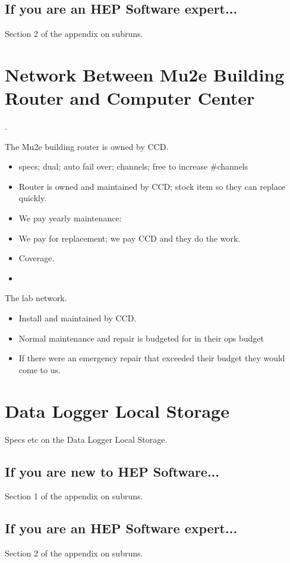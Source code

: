 \section{If you are an HEP Software expert...}

Section 2 of the appendix on subruns.

\chapter{Network Between Mu2e Building Router and Computer Center}
\label{app:RouterAndNetwork}.

The Mu2e building router is owned by CCD.
\begin{itemize}
\item specs; dual; auto fail over; channels; free to increase \#channels
\item Router is owned and maintained by CCD; stock item so they can replace quickly.
\item We pay yearly maintenance: 
\item We pay for replacement; we pay CCD and they do the work. 
\item {} Coverage.
\item {}
\end{itemize}


The lab network.
\begin{itemize}
\item Install and maintained by CCD.
\item Normal maintenance and repair is budgeted for in their ops budget
\item If there were an emergency repair that exceeded their budget they would come to us. 
\end{itemize}

\chapter{Data Logger Local Storage}
\label{app:DataLoggerLocalStorage}

Specs etc on the Data Logger Local Storage.


\section{If you are new to HEP Software...}

Section 1 of the appendix on subruns.


\section{If you are an HEP Software expert...}

Section 2 of the appendix on subruns.

\cleardoublepage
\printindex

